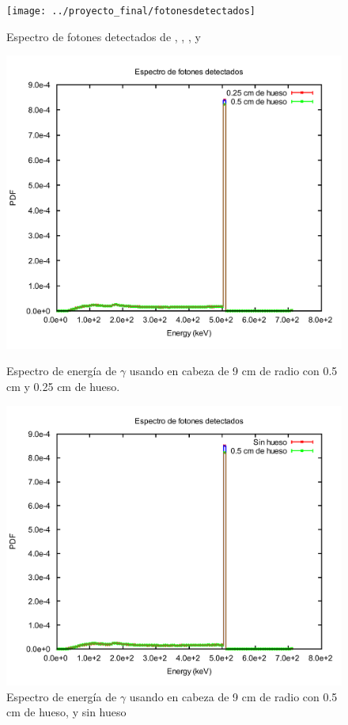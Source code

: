 \documentclass[12pt,a4paper,onecolumn]{article}
\begin{document}
\begin{figure}[H]
	\centering
	\texttt{[image: ../proyecto\_final/fotonesdetectados]}
	\caption{Espectro de fotones detectados de , , ,  y }
	\label{fig:fotonesdetectados}
\end{figure}

\begin{figure}[H]
	\centering
	\begin{minipage}{0.45\textwidth}
		\centering
		\includegraphics[scale=0.3]{025_05hueso}
		\caption{Espectro de energía de $\gamma$ usando  en cabeza de 9 cm de radio con 0.5 cm y 0.25 cm de hueso.} 
		\label{fig:02505hueso}
	\end{minipage}
	\hspace{5mm}
	\begin{minipage}{0.45\textwidth}
		\centering
		\includegraphics[scale=0.3]{2sinhueso05cmhueso}
		\caption{Espectro de energía de $\gamma$ usando  en cabeza de 9 cm de radio con 0.5 cm de hueso, y sin hueso}
		\label{fig:2sinhueso05cmhueso}  
\end{minipage}	
\end{figure}
\end{document}

